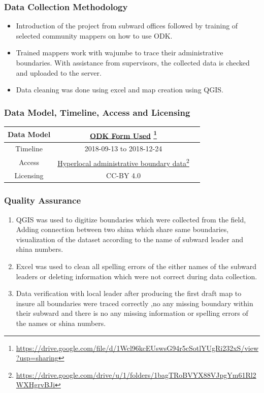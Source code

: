 \documentclass[a4paper,12pt,twoside]{article}
\begin{document}
\subsubsection{Data Collection Methodology}
\begin{itemize}
    \item Introduction of the project from subward offices followed by training of selected community mappers on how to use ODK.
    \item Trained mappers work with wajumbe to trace their administrative boundaries. With assistance from supervisors, the collected data is checked and uploaded to the server. 
    \item Data cleaning was done using excel  and map creation using QGIS.
\end{itemize}

\subsubsection{Data Model, Timeline, Access and Licensing}
\begin{center}
\begin{tabular}{|c|c|c|}  
 \hline
Data Model &
        \href{https://drive.google.com/file/d/1Wcl96kcEUswsG94r5cSotlYUgRi232xS/view?usp=sharing}{ODK Form Used} \footnote{\url{https://drive.google.com/file/d/1Wcl96kcEUswsG94r5cSotlYUgRi232xS/view?usp=sharing}} \\
 \hline
  Timeline  &  2018-09-13 to 2018-12-24 \\
\hline  
 Access  & 
    \href{https://drive.google.com/drive/u/1/folders/1bagTRoBVYX88VJpgYm61Rl2WXHgrvBJi}{Hyperlocal administrative boundary data}\footnote{\url{https://drive.google.com/drive/u/1/folders/1bagTRoBVYX88VJpgYm61Rl2WXHgrvBJi}} \\
   
\hline 
    Licensing & CC-BY 4.0 \\
\hline
\end{tabular}
\end{center}

\subsubsection{Quality Assurance}
\begin{enumerate}
    \item QGIS was used to digitize boundaries which were collected from the field, Adding connection between two shina which share same boundaries, visualization of the dataset according to the name of subward leader and shina numbers. 
    \item Excel was used to clean all spelling errors of the either names of the subward leaders or deleting information which were not correct during data collection. 
    \item Data verification with local leader after producing the first draft map  to insure all boundaries were traced correctly ,no any missing boundary within their subward and  there is no any missing information or spelling errors of the names or shina numbers. 

\end{enumerate}
\end{document}
